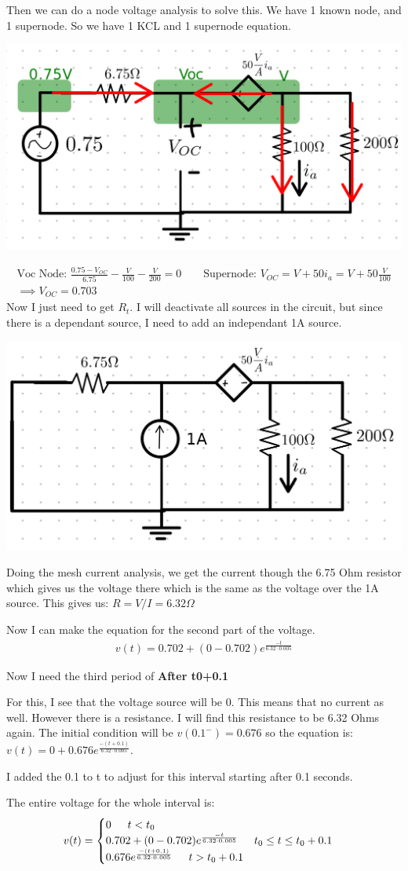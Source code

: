 \documentclass[12pt,letterpaper]{article} \usepackage{amsmath} \usepackage{graphicx} \usepackage[margin=1in]{geometry} \usepackage{longtable}  \usepackage{amssymb}
\begin{document}
\begin{mdframed}[]
	Then we can do a node voltage analysis to solve this. We have 1 known node, and 1 supernode. So we have 1 KCL and 1 supernode equation.
	\begin{center}
		\includegraphics[width=0.4\linewidth]{ex8-4}
	\end{center}
	\begin{align*}
		\text{Voc Node: }\frac{0.75-V_{OC}}{6.75}-\frac{V}{100}-\frac{V}{200}=0\qquad \text{Supernode: }V_{OC}=V+50i_a=V+50\frac{V}{100}\\
		\implies V_{OC}=0.703
	\end{align*}
	Now I just need to get $R_t$. I will deactivate all sources in the circuit, but since there is a dependant source, I need to add an independant 1A source.
	\begin{center}
		\includegraphics[width=0.4\linewidth]{ex8-5}
	\end{center}
	Doing the mesh current analysis, we get the current though the 6.75 Ohm resistor which gives us the voltage there which is the same as the voltage over the 1A source. This gives us: $R=V/I=6.32\Omega$
	
	Now I can make the equation for the second part of the voltage. 
	\begin{align*}
		v(t)=0.702+(0-0.702)e^{\frac{-t}{6.32\cdot 0.005}}
	\end{align*}

	Now I need the third period of \textbf{After t0+0.1}
	
	For this, I see that the voltage source will be 0. This means that no current as well. However there is a resistance. I will find this resistance to be 6.32 Ohms again. The initial condition will be $v(0.1^-)=0.676$ so the equation is: $v(t)=0+0.676e^{\frac{-(t+0.1)}{6.32\cdot 0.005}}$.
	
	I added the 0.1 to t to adjust for this interval starting after 0.1 seconds. 
	
	The entire voltage for the whole interval is: 
	\begin{align*}
		v(t) = 
		\begin{cases} 
			0 \indent t<t_0\\
			0.702+(0-0.702)e^{\frac{-t}{6.32\cdot 0.005}} \indent t_0\le t \le t_0 + 0.1\\
			0.676e^{\frac{-(t+0.1)}{6.32\cdot 0.005}} \indent t > t_0 + 0.1
		\end{cases}
	\end{align*}
	
	\end{mdframed}
	
\end{document}

